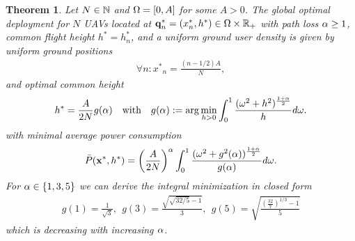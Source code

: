 \documentclass[smallabstract,smallcaptions]{dccpaper}
\newtheorem{theorem}{Theorem}
\newcommand{\Pbar}{\ensuremath{\bar{P}}}         %
\newcommand{\philippstart}{\color{black}}
\begin{document}
%
\newcommand{\pGlob}{\ensuremath{x^{*}}}
\newcommand{\hGlob}{\ensuremath{h^{*}}}
\newcommand{\qGlob}{\ensuremath{{\mathbf q}^{*}}}
\newcommand{\qLoc}{\ensuremath{{\mathbf q}^{*}}}
%
%
\philippstart
%
\begin{theorem}\label{thm:commonheight}
  Let $N\in{\ensuremath{\mathbb N}}$ and $\Omega=[0,A]$ for some $A> 0$. The \emph{global optimal deployment} for $N$ UAVs located  at
   $\qLoc_n=(x_n^{*},h^{*})\in \Ome\times
  \R_+$ with path loss $\alpha\geq 1$, common flight height $h^*=h_n^*$, and a uniform ground user density is given
  by uniform ground positions   
   \begin{align}
     \forall n \colon \pGlob_n=  \frac{(n-1/2)A}{N}, 
  \end{align}
  and optimal common height
  \begin{align}
    h^*= \frac{A}{2N} g(\alpha)\quad\text{with}\quad g(\alpha):= \arg\min_{h>0} \int_0^{1}
    \frac{(\omega^2+h^2)^{\frac{1+\alpha}{2}}}{h}d\omega.\label{eq:optimalheight}
  \end{align}
  with minimal average power consumption
  \begin{align}
    \Pbar(\vx^*,h^*)=\left(\frac{A}{2N}\right)^{\alp}  \int_0^1
    \frac{(\ome^2+g^2(\alp))^{\frac{1+\alp}{2}}}{g(\alp)}
    d\ome\label{eq:optimumavpow}.
  \end{align}
  For $\alpha\in\{1,3,5\}$ we can derive the integral minimization in closed form 
  \begin{align}
    g(1) = \frac{1}{\sqrt{3}}\label{eq:alponedonehequal2},\ \  g(3) = \frac{\sqrt{\sqrt{32/5}-1}}{3}, 
   \ \  g(5) = \sqrt{\frac{ (\frac{32}{7})^{1/3}-1}{5}}
  \end{align}
  which is decreasing with increasing $\alpha$.
\end{theorem}
%
\end{document}
